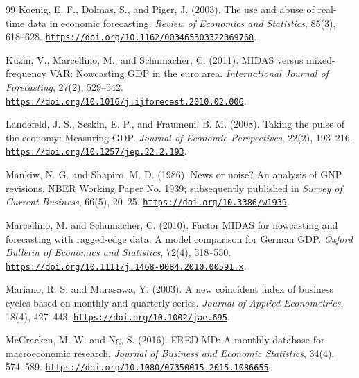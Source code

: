 \documentclass[12pt]{article}
\begin{document}
\begin{thebibliography}{99}
Koenig, E. F., Dolmas, S., and Piger, J. (2003).
The use and abuse of real-time data in economic forecasting.
\emph{Review of Economics and Statistics}, 85(3), 618--628. \href{https://doi.org/10.1162/003465303322369768}{\nolinkurl{https://doi.org/10.1162/003465303322369768}}.

Kuzin, V., Marcellino, M., and Schumacher, C. (2011).
MIDAS versus mixed-frequency VAR: Nowcasting GDP in the euro area.
\emph{International Journal of Forecasting}, 27(2), 529--542. \href{https://doi.org/10.1016/j.ijforecast.2010.02.006}{\nolinkurl{https://doi.org/10.1016/j.ijforecast.2010.02.006}}.

Landefeld, J. S., Seskin, E. P., and Fraumeni, B. M. (2008).
Taking the pulse of the economy: Measuring GDP.
\emph{Journal of Economic Perspectives}, 22(2), 193--216. \href{https://doi.org/10.1257/jep.22.2.193}{\nolinkurl{https://doi.org/10.1257/jep.22.2.193}}.

Mankiw, N. G. and Shapiro, M. D. (1986).
News or noise? An analysis of GNP revisions.
NBER Working Paper No. 1939; subsequently published in \emph{Survey of Current Business}, 66(5), 20--25. \href{https://doi.org/10.3386/w1939}{\nolinkurl{https://doi.org/10.3386/w1939}}.

Marcellino, M. and Schumacher, C. (2010).
Factor MIDAS for nowcasting and forecasting with ragged-edge data: A model comparison for German GDP.
\emph{Oxford Bulletin of Economics and Statistics}, 72(4), 518--550. \href{https://doi.org/10.1111/j.1468-0084.2010.00591.x}{\nolinkurl{https://doi.org/10.1111/j.1468-0084.2010.00591.x}}.

Mariano, R. S. and Murasawa, Y. (2003).
A new coincident index of business cycles based on monthly and quarterly series.
\emph{Journal of Applied Econometrics}, 18(4), 427--443. \href{https://doi.org/10.1002/jae.695}{\nolinkurl{https://doi.org/10.1002/jae.695}}.

McCracken, M. W. and Ng, S. (2016).
FRED-MD: A monthly database for macroeconomic research.
\emph{Journal of Business and Economic Statistics}, 34(4), 574--589. \href{https://doi.org/10.1080/07350015.2015.1086655}{\nolinkurl{https://doi.org/10.1080/07350015.2015.1086655}}.


\end{thebibliography}
\end{document}
